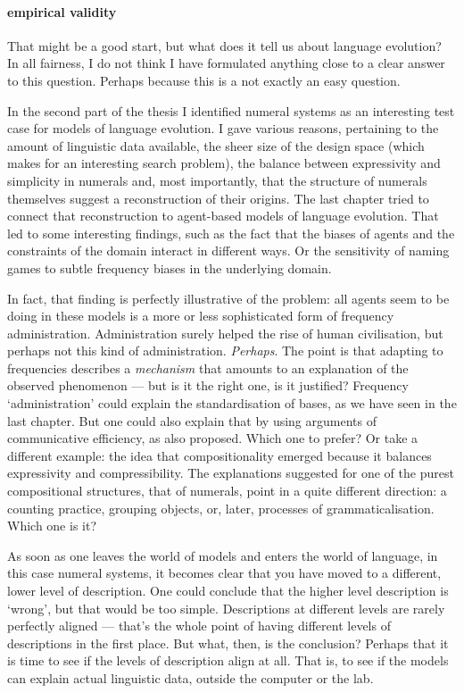 \documentclass{../src/bcthesispart}
\begin{document}
\paragraph{empirical validity}

That might be a good start, but what does it tell us about language evolution?
In all fairness, I do not think I have formulated anything close to a clear answer to this question.
Perhaps because this is a not exactly an easy question.




In the second part of the thesis I identified numeral systems as an interesting test case for models of language evolution.
I gave various reasons, pertaining to the amount of linguistic data available, the sheer size of the design space (which makes for an interesting search problem), the balance between expressivity and simplicity in numerals and, most importantly, that the structure of numerals themselves suggest a reconstruction of their origins.
The last chapter tried to connect that reconstruction to agent-based models of language evolution.
That led to some interesting findings, such as the fact that the biases of agents and the constraints of the domain interact in different ways.
Or the sensitivity of naming games to subtle frequency biases in the underlying domain.




In fact, that finding is perfectly illustrative of the problem: all agents seem to be doing in these models is a more or less sophisticated form of frequency administration. 
Administration surely helped the rise of human civilisation, but perhaps not this kind of administration.
\emph{Perhaps}. 
The point is that adapting to  frequencies describes a \emph{mechanism} that amounts to an explanation of the observed phenomenon — but is it the right one, is it justified? 
Frequency ‘administration’ could explain the standardisation of bases, as we have seen in the last chapter.
But one could also explain that by using arguments of communicative efficiency, as \textcite{Hurford1987} also proposed.
Which one to prefer?
Or take a different example: the idea that compositionality emerged because it balances expressivity and compressibility.
The explanations suggested for one of the purest compositional structures, that of numerals, point in a quite different direction: a counting practice, grouping objects, or, later, processes of grammaticalisation.
Which one is it?



As soon as one leaves the world of models and enters the world of language, in this case numeral systems, it becomes clear that you have moved to a different, lower level of description.
One could conclude that the higher level description is ‘wrong’, but that would be too simple.
Descriptions at different levels are rarely perfectly aligned — that’s the whole point of having different levels of descriptions in the first place.
But what, then, is the conclusion?
Perhaps that it is time to see if the levels of description align at all.
That is, to see if the models can explain actual linguistic data, outside the computer or the lab.
\end{document}
